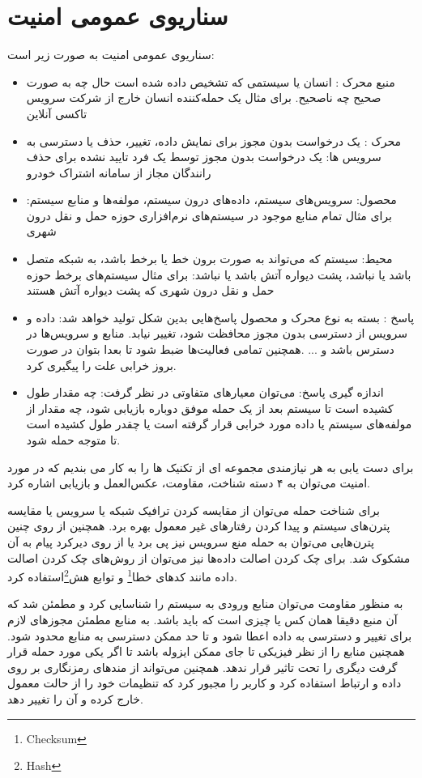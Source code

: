 \section{سناریوی عمومی امنیت}
سناریو‌ی عمومی امنیت به صورت زیر است:
\begin{itemize}
\item
منبع محرک : انسان یا سیستمی که تشخیص داده شده است حال چه به صورت صحیح چه ناصحیح. برای مثال یک حمله‌کننده انسان خارج از شرکت سرویس تاکسی آنلاین
\item
محرک : یک در‌خواست بدون مجوز برای نمایش داده، تغییر، حذف یا دسترسی به سرویس ها: یک درخواست بدون مجوز توسط یک فرد تایید نشده برای حذف رانندگان مجاز از سامانه اشتراک خودرو
\item
محصول: 
سرویس‌های سیستم، داده‌های درون سیستم، مولفه‌ها و منابع سیستم: برای مثال تمام منابع موجود در سیستم‌های نرم‌افزاری حوزه حمل‌ و نقل درون شهری
\item
محیط:
سیستم که می‌تواند به صورت برون خط یا برخط باشد، به شبکه متصل باشد یا نباشد، پشت دیواره آتش باشد یا نباشد: برای مثال سیستم‌های برخط حوزه حمل و نقل درون شهری که پشت دیواره آتش هستند 
\item
پاسخ : بسته به نوع محرک و محصول پاسخ‌هایی بدین شکل تولید خواهد شد: داده و سرویس از دسترسی بدون مجوز محافظت شود، تغییر نیابد. منابع و سرویس‌ها در دسترس باشد و ... .همچنین تمامی فعالیت‌ها ضبط شود تا بعدا بتوان در صورت بروز خرابی علت را پیگیری کرد. 
\item
اندازه گیری پاسخ: می‌توان معیارهای متفاوتی در نظر گرفت: چه مقدار طول کشیده است تا سیستم بعد از یک حمله موفق دوباره بازیابی شود، چه مقدار از مولفه‌های سیستم یا داده مورد خرابی قرار گرفته است یا چقدر طول کشیده است تا متوجه حمله شود.
\end{itemize}

برای دست یابی به هر نیازمندی مجموعه ای از تکنیک ها را به کار می بندیم که در مورد امنیت می‌توان به ۴ دسته شناخت، مقاومت، عکس‌العمل و بازیابی اشاره کرد.


برای شناخت حمله می‌توان از مقایسه کردن ترافیک شبکه یا سرویس یا مقایسه پترن‌های سیستم و پیدا کردن رفتار‌های غیر معمول بهره برد.
همچنین از روی چنین پترن‌هایی می‌توان به حمله منع سرویس نیز پی برد یا از روی دیرکرد پیام به آن مشکوک شد. برای چک کردن اصالت داد‌ه‌ها نیز می‌توان از روش‌های چک کردن اصالت داده مانند کدهای خطا\footnote{Checksum}
و توابع هش\footnote{Hash}استفاده کرد.

به منظور مقاومت می‌توان منابع ورودی به سیستم را شناسایی کرد و مطمئن شد که آن منبع دقیقا همان کس یا چیزی است که باید باشد. به منابع مطمئن مجوزهای لازم برای تغییر و دسترسی به داده اعطا شود و تا حد ممکن دسترسی به منابع محدود شود. 
همچنین منابع را از نظر فیزیکی تا جای ممکن ایزوله باشد تا اگر یکی مورد حمله قرار گرفت دیگری را تحت تاثیر قرار ندهد. همچنین می‌تواند از مندهای رمزنگاری بر روی داده و ارتباط استفاده کرد و کاربر را مجبور کرد که تنظیمات خود را از حالت معمول خارج کرده و آن را تغییر دهد.

